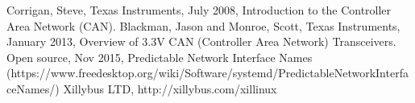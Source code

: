 \begin{thebibliography}{11} %
			Corrigan, Steve, Texas Instruments, July 2008, Introduction to the Controller Area Network (CAN).
			Blackman, Jason and Monroe, Scott, Texas Instruments, January 2013, Overview of 3.3V CAN (Controller Area Network) Transceivers.
			Open source, Nov 2015, Predictable Network Interface Names (https://www.freedesktop.org/wiki/Software/systemd/PredictableNetworkInterfaceNames/)
			Xillybus LTD, http://xillybus.com/xillinux
%
\end{thebibliography}